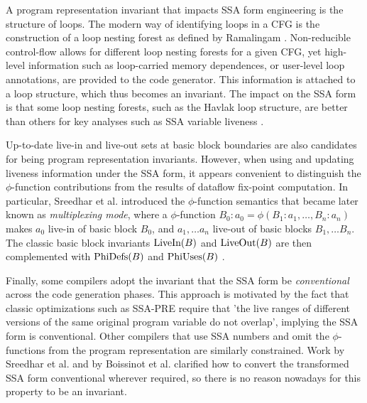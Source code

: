 A program representation invariant that impacts SSA form engineering is the
structure of loops. The modern way of identifying loops in a CFG is the
construction of a loop nesting forest as defined by Ramalingam
\cite{Ramalingam:2002:TOPLAS}. Non-reducible control-flow allows for different
loop nesting forests for a given CFG, yet high-level information such as
loop-carried memory dependences, or user-level loop annotations, are provided to
the code generator. This information is attached to a loop structure, which thus
becomes an invariant. The impact on the SSA form is that some loop nesting
forests, such as the Havlak \cite{Havlak:1997:TOPLAS} loop structure, are better than
others for key analyses such as SSA variable liveness
\cite{Boissinot:2011:APLAS}.

Up-to-date live-in and live-out sets at basic block boundaries are also
candidates for being program representation invariants. However, when using and
updating liveness information under the SSA form, it appears convenient to
distinguish the $\phi$-function contributions from the results of dataflow
fix-point computation.  In particular, Sreedhar et al.  \cite{Sreedhar:1999:SAS}
introduced the $\phi$-function semantics that became later known as
\emph{multiplexing mode},%
where a
$\phi$-function $B_0:a_0=\phi(B_1:a_1,\dots,B_n:a_n)$ makes $a_0$ live-in of
basic block $B_0$, and $a_1,\dots a_n$ live-out of basic blocks $B_1,\dots B_n$.
The classic basic block invariants $\hbox{LiveIn}(B)$ and $\hbox{LiveOut}(B)$
are then complemented with $\hbox{PhiDefs}(B)$ and $\hbox{PhiUses}(B)$
\cite{Boissinot:2011:APLAS}.

Finally, some compilers adopt the invariant that the SSA form be
\emph{conventional} across the code generation phases. This approach is
motivated by the fact that classic optimizations such as SSA-PRE
\cite{Kennedy:1999:TOPLAS} require that 'the live ranges of different versions
of the same original program variable do not overlap', implying the SSA form is
conventional. Other compilers that use SSA numbers and omit the $\phi$-functions
from the program representation \cite{Lapkowski:1996:CASCON} are similarly
constrained. Work by Sreedhar et al.  \cite{Sreedhar:1999:SAS} and by Boissinot
et al.  \cite{Boissinot:2009:CGO} clarified how to convert the transformed SSA
form conventional wherever required, so there is no reason nowadays for this
property to be an invariant.



